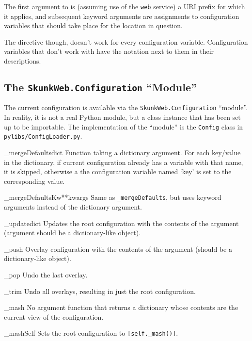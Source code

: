 \documentclass{manual}
\begin{document}
The first argument to \Location{} is (assuming use of the \texttt{web}
service) a URI prefix for which it applies, and subsequent keyword
arguments are assignments to configuration variables that should take
place for the location in question. 

The \Location{} directive though, doesn't work for every configuration
variable.  Configuration variables that don't work with \Location{}
have the notation \nolocation next to them in their descriptions.


\subsection{The \texttt{SkunkWeb.Configuration} ``Module''}

The current configuration is available via the
\texttt{SkunkWeb.Configuration} ``module''.  In reality, it is not a
real Python module, but a class instance that has been set up to be
importable.  The implementation of the ``module'' is the
\texttt{Config} class in  \verb!pylibs/ConfigLoader.py!.

\begin{methoddesc}{\_mergeDefaults}{dict} Function taking a dictionary
argument. For each key/value in the dictionary, if current
configuration already has a variable with that name, it is skipped,
otherwise a the configuration variable named `key' is set to the
corresponding value. 
\end{methoddesc}
\begin{methoddesc}{\_mergeDefaultsKw}{**kwargs}  Same as
\texttt{\_mergeDefaults}, but uses keyword arguments instead of the
dictionary argument. 
\end{methoddesc}
\begin{methoddesc}{\_update}{dict} Updates the root configuration with the
contents of the argument (argument should be a dictionary-like
object). 
\end{methoddesc}
\begin{methoddesc}{\_push}{} Overlay configuration with the contents
of the argument (should be a dictionary-like object). 
\end{methoddesc}
\begin{methoddesc}{\_pop}{} Undo the last overlay.
\end{methoddesc}
\begin{methoddesc}{\_trim}{} Undo all overlays, resulting in just the
root configuration. 
\end{methoddesc}
\begin{methoddesc}{\_mash}{} No argument function that returns a
dictionary whose contents are the current view of the configuration.
\end{methoddesc}
\begin{methoddesc}{\_mashSelf}{} Sets the root configuration to
\verb![self._mash()]!. 
\end{methoddesc}
\end{document}
